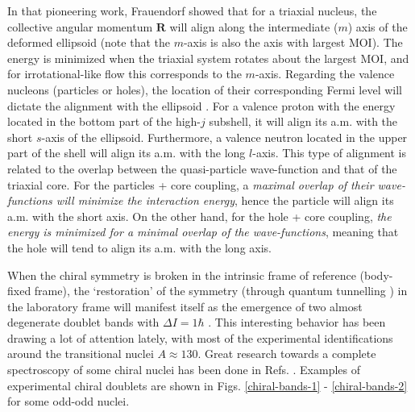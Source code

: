 In that pioneering work, Frauendorf showed that for a triaxial nucleus, the collective angular momentum $\mathbf{R}$ will align along the intermediate ($m$) axis of the deformed ellipsoid (note that the $m$-axis is also the axis with largest MOI). The energy is minimized when the triaxial system rotates about the largest MOI, and for irrotational-like flow this corresponds to the $m$-axis. Regarding the valence nucleons (particles or holes), the location of their corresponding Fermi level will dictate the alignment with the ellipsoid \cite{frauendorf1997tilted,starosta2001chiral}. For a valence proton with the energy located in the bottom part of the high-$j$ subshell, it will align its a.m. with the short $s$-axis of the ellipsoid. Furthermore, a valence neutron located in the upper part of the shell will align its a.m. with the long $l$-axis. This type of alignment is related to the overlap between the quasi-particle wave-function and that of the triaxial core. For the particles + core coupling, a \emph{maximal overlap of their wave-functions will minimize the interaction energy}, hence the particle will align its a.m. with the short axis. On the other hand, for the hole + core coupling, \emph{the energy is minimized for a minimal overlap of the wave-functions}, meaning that the hole will tend to align its a.m. with the long axis.

When the chiral symmetry is broken in the intrinsic frame of reference (body-fixed frame), the `restoration' of the symmetry (through quantum tunnelling \cite{zhang2007chiral}) in the laboratory frame will manifest itself as the emergence of two almost degenerate doublet bands with $\Delta I=1\hbar$ \cite{frauendorf1997tilted}. This interesting behavior has been drawing a lot of attention lately, with most of the experimental identifications around the transitional nuclei $A\approx 130$. Great research towards a complete spectroscopy of some chiral nuclei has been done in Refs. \cite{starosta2001chiral,meng2008chiral,budaca2018tilted,budaca2018semiclassical,budaca2021chiral}. Examples of experimental chiral doublets are shown in Figs. \ref{chiral-bands-1} - \ref{chiral-bands-2} for some odd-odd nuclei.

